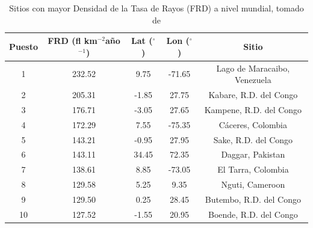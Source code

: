\documentclass[12pt,oneside,openany,letter]{book}
\begin{document}
\begin{table}[]
\caption{Sitios con mayor Densidad de la Tasa de Rayos (FRD) a nivel mundial, tomado de \cite{AlbrechtEtal2016}}
\label{topten}
\begin{tabular}{|c|c|c|c|c|}
\hline
\textbf{Puesto} & \textbf{FRD (fl km$^{-2}$año$^{-1}$)} & \textbf{Lat ($^{\circ}$)} & \textbf{Lon ($^{\circ}$)} & \textbf{Sitio}               \\ \hline
1                       & 232.52       & 9.75             & -71.65            & Lago de Maracaibo, Venezuela \\ \hline
2                       & 205.31       & -1.85            & 27.75             & Kabare, R.D. del Congo       \\ \hline
3                       & 176.71       & -3.05            & 27.65             & Kampene, R.D. del Congo      \\ \hline
4                       & 172.29       & 7.55             & -75.35            & Cáceres, Colombia            \\ \hline
5                       & 143.21       & -0.95            & 27.95             & Sake, R.D. del Congo         \\ \hline
6                       & 143.11       & 34.45            & 72.35             & Daggar, Pakistan             \\ \hline
7                       & 138.61       & 8.85             & -73.05            & El Tarra, Colombia           \\ \hline
8                       & 129.58       & 5.25             & 9.35              & Nguti, Cameroon              \\ \hline
9                       & 129.50       & 0.25             & 28.45             & Butembo, R.D. del Congo      \\ \hline
10                      & 127.52       & -1.55            & 20.95             & Boende, R.D. del Congo       \\ \hline
\end{tabular}
\end{table}




\end{document}
